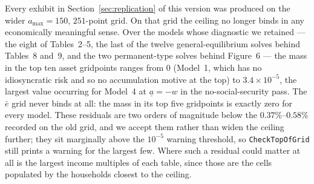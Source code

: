 \documentclass[11pt,fleqn]{article}
\begin{document}
Every exhibit in Section~\ref{sec:replication} of this version was produced on the wider $a_{\max}=150$, $251$-point grid. On that grid the ceiling no longer binds in any economically meaningful sense. Over the models whose diagnostic we retained --- the eight of Tables~2--5, the last of the twelve general-equilibrium solves behind Tables~8 and~9, and the two permanent-type solves behind Figure~6 --- the mass in the top ten asset gridpoints ranges from $0$ (Model~1, which has no idiosyncratic risk and so no accumulation motive at the top) to $3.4\times10^{-5}$, the largest value occurring for Model~4 at $\underline{a}=-w$ in the no-social-security pass. The $\bar{e}$ grid never binds at all: the mass in its top five gridpoints is exactly zero for every model. These residuals are two orders of magnitude below the $0.37\%$--$0.58\%$ recorded on the old grid, and we accept them rather than widen the ceiling further; they sit marginally above the $10^{-5}$ warning threshold, so \texttt{CheckTopOfGrid} still prints a warning for the largest few. Where such a residual could matter at all is the largest income multiples of each table, since those are the cells populated by the households closest to the ceiling.





\end{document}
